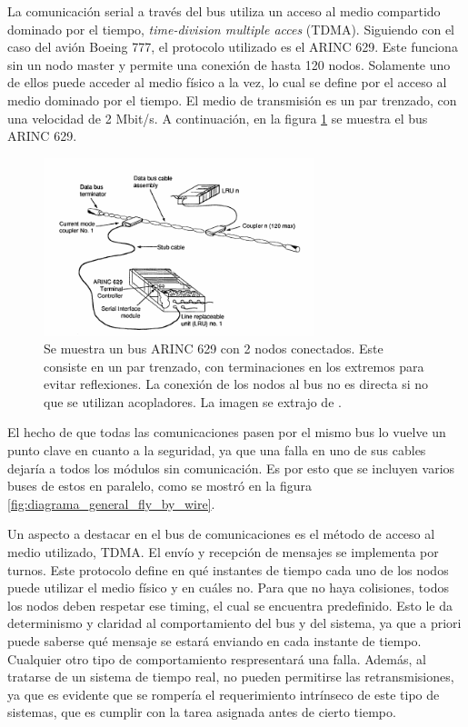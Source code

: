 La comunicación serial a través del bus utiliza un acceso al medio compartido dominado por el tiempo, \textit{time-division multiple acces} (TDMA). Siguiendo con el caso del avión Boeing 777, el protocolo utilizado es el ARINC 629. Este funciona sin un nodo master y permite una conexión de hasta 120 nodos. Solamente uno de ellos puede acceder al medio físico a la vez, lo cual se define por el acceso al medio dominado por el tiempo. El medio de transmisión es un par trenzado, con una velocidad de 2 Mbit/s. A continuación, en la figura \ref{fig:ARINC_629_bus} se muestra el bus ARINC 629.

\begin{figure}[H]
    \centering
    \includegraphics[width=0.7\textwidth]{img/ARINC_629_bus.png}
    \caption{Se muestra un bus ARINC 629 con 2 nodos conectados. Este consiste en un par trenzado, con terminaciones en los extremos para evitar reflexiones. La conexión de los nodos al bus no es directa si no que se utilizan acopladores. La imagen se extrajo de \cite{yeh1996triple}.}
    \label{fig:ARINC_629_bus}    
\end{figure}

El hecho de que todas las comunicaciones pasen por el mismo bus lo vuelve un punto clave en cuanto a la seguridad, ya que una falla en uno de sus cables dejaría a todos los módulos sin comunicación. Es por esto que se incluyen varios buses de estos en paralelo, como se mostró en la figura \ref{fig:diagrama_general_fly_by_wire}.

Un aspecto a destacar en el bus de comunicaciones es el método de acceso al medio utilizado, TDMA. El envío y recepción de mensajes se implementa por turnos. Este protocolo define en qué instantes de tiempo cada uno de los nodos puede utilizar el medio físico y en cuáles no. Para que no haya colisiones, todos los nodos deben respetar ese timing, el cual se encuentra predefinido. Esto le da determinismo y claridad al comportamiento del bus y del sistema, ya que a priori puede saberse qué mensaje se estará enviando en cada instante de tiempo. Cualquier otro tipo de comportamiento respresentará una falla. Además, al tratarse de un sistema de tiempo real, no pueden permitirse las retransmisiones, ya que es evidente que se rompería el requerimiento intrínseco de este tipo de sistemas, que es cumplir con la tarea asignada antes de cierto tiempo.

